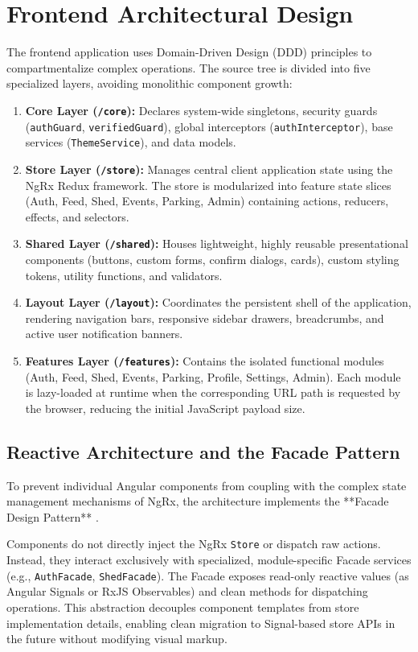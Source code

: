 \section{Frontend Architectural Design}
The frontend application uses Domain-Driven Design (DDD) principles to compartmentalize complex operations. The source tree is divided into five specialized layers, avoiding monolithic component growth:
\begin{enumerate}
    \item \textbf{Core Layer (\texttt{/core}):} Declares system-wide singletons, security guards (\texttt{authGuard}, \texttt{verifiedGuard}), global interceptors (\texttt{authInterceptor}), base services (\texttt{ThemeService}), and data models.
    \item \textbf{Store Layer (\texttt{/store}):} Manages central client application state using the NgRx Redux framework. The store is modularized into feature state slices (Auth, Feed, Shed, Events, Parking, Admin) containing actions, reducers, effects, and selectors.
    \item \textbf{Shared Layer (\texttt{/shared}):} Houses lightweight, highly reusable presentational components (buttons, custom forms, confirm dialogs, cards), custom styling tokens, utility functions, and validators.
    \item \textbf{Layout Layer (\texttt{/layout}):} Coordinates the persistent shell of the application, rendering navigation bars, responsive sidebar drawers, breadcrumbs, and active user notification banners.
    \item \textbf{Features Layer (\texttt{/features}):} Contains the isolated functional modules (Auth, Feed, Shed, Events, Parking, Profile, Settings, Admin). Each module is lazy-loaded at runtime when the corresponding URL path is requested by the browser, reducing the initial JavaScript payload size.
\end{enumerate}

\subsection{Reactive Architecture and the Facade Pattern}
To prevent individual Angular components from coupling with the complex state management mechanisms of NgRx, the architecture implements the **Facade Design Pattern** \cite{gamma1994design}. 

Components do not directly inject the NgRx \texttt{Store} or dispatch raw actions. Instead, they interact exclusively with specialized, module-specific Facade services (e.g., \texttt{AuthFacade}, \texttt{ShedFacade}). The Facade exposes read-only reactive values (as Angular Signals or RxJS Observables) and clean methods for dispatching operations. This abstraction decouples component templates from store implementation details, enabling clean migration to Signal-based store APIs in the future without modifying visual markup.

